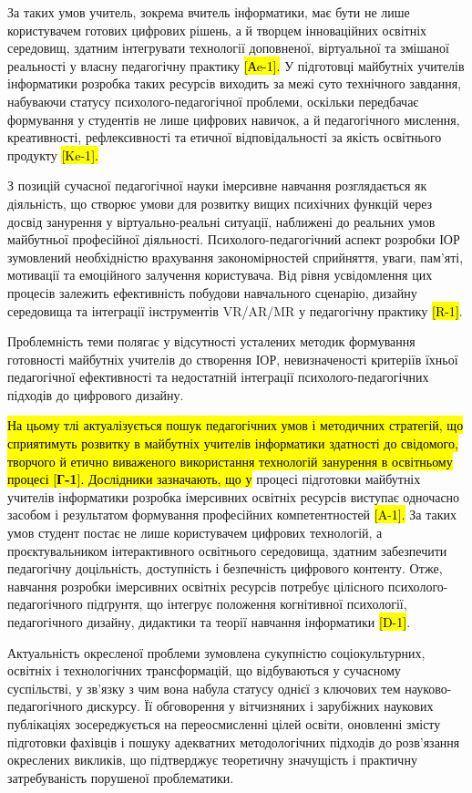 За таких умов учитель, зокрема вчитель інформатики, має бути не лише користувачем готових цифрових рішень, а й творцем інноваційних освітніх середовищ, здатним інтегрувати технології доповненої, віртуальної та змішаної реальності у власну педагогічну практику \hl{{[}Аe-1{]}.} У підготовці майбутніх учителів інформатики розробка таких ресурсів виходить за межі суто технічного завдання, набуваючи статусу психолого-педагогічної проблеми, оскільки передбачає формування у студентів не лише цифрових навичок, а й педагогічного мислення, креативності, рефлексивності та етичної відповідальності за якість освітнього продукту \hl{{[}Ke-1{]}.}

З позицій сучасної педагогічної науки імерсивне навчання розглядається як діяльність, що створює умови для розвитку вищих психічних функцій через досвід занурення у віртуально-реальні ситуації, наближені до реальних умов майбутньої професійної діяльності. Психолого-педагогічний аспект розробки ІОР зумовлений необхідністю врахування закономірностей сприйняття, уваги, пам'яті, мотивації та емоційного залучення користувача. Від рівня усвідомлення цих процесів залежить ефективність побудови навчального сценарію, дизайну середовища та інтеграції інструментів VR/AR/MR у педагогічну практику \hl{{[}R-1{]}}.

Проблемність теми полягає у відсутності усталених методик формування готовності майбутніх учителів до створення ІОР, невизначеності критеріїв їхньої педагогічної ефективності та недостатній інтеграції психолого-педагогічних підходів до цифрового дизайну.

\hl{На цьому тлі актуалізується пошук педагогічних умов і методичних стратегій, що сприятимуть розвитку в майбутніх учителів інформатики здатності до свідомого, творчого й етично виваженого використання технологій занурення в освітньому процесі {[}\textbf{Г-1}{]}. Дослідники зазначають, що у} процесі підготовки майбутніх учителів інформатики розробка імерсивних освітніх ресурсів виступає одночасно засобом і результатом формування професійних компетентностей \hl{{[}A-1{]}.} За таких умов студент постає не лише користувачем цифрових технологій, а проєктувальником інтерактивного освітнього середовища, здатним забезпечити педагогічну доцільність, доступність і безпечність цифрового контенту. Отже, навчання розробки імерсивних освітніх ресурсів потребує цілісного психолого-педагогічного підґрунтя, що інтегрує положення когнітивної психології, педагогічного дизайну, дидактики та теорії навчання інформатики \hl{{[}D-1{]}}.

Актуальність окресленої проблеми зумовлена сукупністю соціокультурних, освітніх і технологічних трансформацій, що відбуваються у сучасному суспільстві, у зв'язку з чим вона набула статусу однієї з ключових тем науково-педагогічного дискурсу. Її обговорення у вітчизняних і зарубіжних наукових публікаціях зосереджується на переосмисленні цілей освіти, оновленні змісту підготовки фахівців і пошуку адекватних методологічних підходів до розв'язання окреслених викликів, що підтверджує теоретичну значущість і практичну затребуваність порушеної проблематики.


